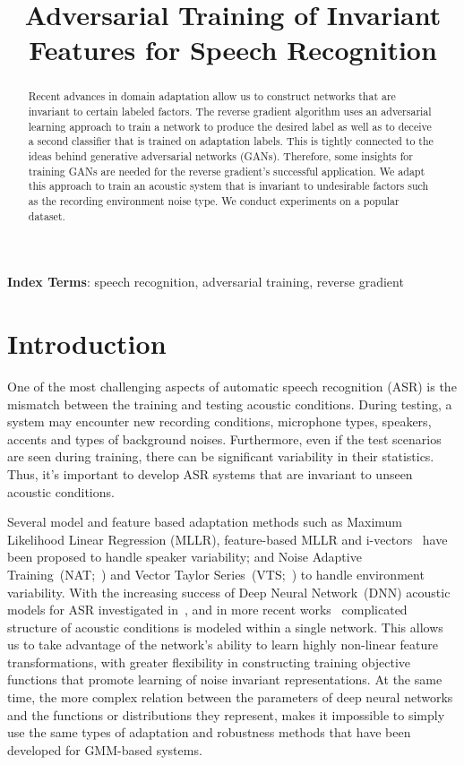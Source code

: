 \documentclass[a4paper]{article}
\title{Adversarial Training of Invariant Features for Speech Recognition}
\begin{document}
\maketitle
% 
\begin{abstract}
Recent advances in domain adaptation allow us to construct networks that are
invariant to certain labeled factors. The reverse gradient algorithm uses an
adversarial learning approach to train a network to produce the desired label
as well as to deceive a second classifier that is trained on adaptation 
labels. This is tightly connected to the ideas behind generative adversarial 
networks (GANs). Therefore, some insights for training GANs are needed for the
reverse gradient's successful application. We adapt this approach to train an 
acoustic system that is invariant to undesirable factors such as the recording
environment noise type. We conduct experiments on a popular dataset.
\end{abstract}
\noindent\textbf{Index Terms}: speech recognition, adversarial training, 
reverse gradient
\section{Introduction}
\label{sec:intro}
    One of the most challenging aspects of automatic speech recognition (ASR)
    is the mismatch between the training and testing acoustic conditions. 
    During testing, a system may encounter new recording conditions, 
    microphone types, speakers, accents and types of background noises. 
    Furthermore, even if the test scenarios are seen during training, there 
    can be significant variability in their statistics. Thus, it's important to 
    develop ASR systems that are invariant to unseen acoustic conditions.

    Several model and feature based adaptation methods such as Maximum 
    Likelihood Linear Regression (MLLR),  feature-based MLLR and 
    i-vectors~\cite{saon2013speaker} have been proposed to handle speaker 
    variability; and Noise Adaptive Training~(NAT;~\cite{kalinli2010noise})
    and Vector Taylor Series~(VTS;~\cite{un1998speech}) to handle 
    environment variability.
    With the increasing success of Deep Neural 
    Network~(DNN) acoustic models for ASR investigated 
    in~\cite{hinton2012deep}\cite{seide2011conversational}\cite{sainath2011making}, 
    and in more recent works~\cite{miao2015eesen}\cite{sainath2015learning} 
    complicated structure of acoustic conditions is modeled within a single network.
    This allows us to take 
    advantage of the network's ability to learn highly non-linear feature 
    transformations, with greater flexibility in constructing training 
    objective functions that promote learning of noise invariant 
    representations.
    At the same time, the more complex relation between the parameters of deep
    neural networks and the functions or distributions they represent, makes it
    impossible to simply use the same types of adaptation and robustness methods
    that have been developed for GMM-based systems.
\end{document}
